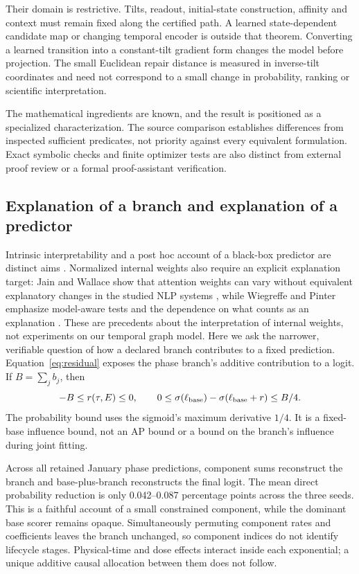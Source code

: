Their domain is restrictive. Tilts, readout, initial-state construction, affinity and context must remain fixed along the certified path. A learned state-dependent candidate map or changing temporal encoder is outside that theorem. Converting a learned transition into a constant-tilt gradient form changes the model before projection. The small Euclidean repair distance is measured in inverse-tilt coordinates and need not correspond to a small change in probability, ranking or scientific interpretation.

The mathematical ingredients are known, and the result is positioned as a specialized characterization. The source comparison establishes differences from inspected sufficient predicates, not priority against every equivalent formulation. Exact symbolic checks and finite optimizer tests are also distinct from external proof review or a formal proof-assistant verification.

\subsection{Explanation of a branch and explanation of a predictor}
Intrinsic interpretability and a post hoc account of a black-box predictor are distinct aims \cite{rudin}. Normalized internal weights also require an explicit explanation target: Jain and Wallace show that attention weights can vary without equivalent explanatory changes in the studied NLP systems \cite{attention}, while Wiegreffe and Pinter emphasize model-aware tests and the dependence on what counts as an explanation \cite{attentiontests}. These are precedents about the interpretation of internal weights, not experiments on our temporal graph model. Here we ask the narrower, verifiable question of how a declared branch contributes to a fixed prediction.
Equation~\eqref{eq:residual} exposes the phase branch's additive contribution to a logit. If $B=\sum_j b_j$, then
\begin{equation}\label{eq:influence}
-B\le r(\tau,E)\le0,\qquad
0\le\sigma(\ell_{\rm base})-\sigma(\ell_{\rm base}+r)\le B/4.
\end{equation}
The probability bound uses the sigmoid's maximum derivative $1/4$. It is a fixed-base influence bound, not an AP bound or a bound on the branch's influence during joint fitting.

Across all retained January phase predictions, component sums reconstruct the branch and base-plus-branch reconstructs the final logit. The mean direct probability reduction is only 0.042--0.087 percentage points across the three seeds. This is a faithful account of a small constrained component, while the dominant base scorer remains opaque. Simultaneously permuting component rates and coefficients leaves the branch unchanged, so component indices do not identify lifecycle stages. Physical-time and dose effects interact inside each exponential; a unique additive causal allocation between them does not follow.

